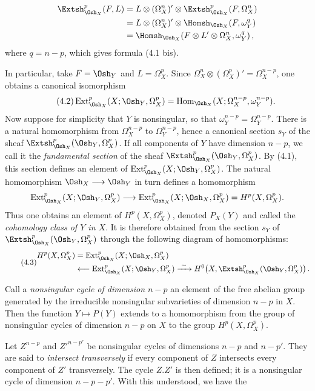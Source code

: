 \begin{align*}
\Extsh_{\Osh_X}^{p}(F,L)
&=L\otimes(\Omega_X^{n})'\otimes
  \Extsh_{\Osh_X}^{p}(F,\Omega_X^{n})\\
&=L\otimes(\Omega_X^{n})'\otimes
  \Homsh_{\Osh_X}(F,\omega_Y^{q})\\
&=\Homsh_{\Osh_X}\!\left(
  F\otimes L'\otimes\Omega_X^{n},\omega_Y^{q}\right),
\end{align*}
where $q=n-p$, which gives formula (4.1 bis).

In particular, take $F=\Osh_Y$ and $L=\Omega_X^{p}$. Since
$\Omega_X^{n}\otimes(\Omega_X^{p})'=\Omega_X^{n-p}$, one obtains a canonical
isomorphism
\begin{equation}\tag{4.2}
  \operatorname{Ext}_{\Osh_X}^{p}(X;\Osh_Y,\Omega_X^{p})
  =\operatorname{Hom}_{\Osh_X}
  (X;\Omega_X^{n-p},\omega_Y^{n-p}).
\end{equation}
Now suppose for simplicity that $Y$ is nonsingular, so that
$\omega_Y^{n-p}=\Omega_Y^{n-p}$. There is a natural homomorphism from
$\Omega_X^{n-p}$ to $\Omega_Y^{n-p}$, hence a canonical section $s_Y$ of the
sheaf $\Extsh_{\Osh_X}^{p}(\Osh_Y,\Omega_X^{p})$. If all components of $Y$ have
dimension $n-p$, we call it the \emph{fundamental section} of the sheaf
$\Extsh_{\Osh_X}^{p}(\Osh_Y,\Omega_X^{p})$. By (4.1), this section defines an
element of $\operatorname{Ext}_{\Osh_X}^{p}(X;\Osh_Y,\Omega_X^{p})$. The natural
homomorphism $\Osh_X\longrightarrow\Osh_Y$ in turn defines a homomorphism
\[
  \operatorname{Ext}_{\Osh_X}^{p}(X;\Osh_Y,\Omega_X^{p})
  \longrightarrow
  \operatorname{Ext}_{\Osh_X}^{p}(X;\Osh_X,\Omega_X^{p})
  =H^{p}(X,\Omega_X^{p}).
\]
Thus one obtains an element of $H^{p}(X,\Omega_X^{p})$, denoted $P_X(Y)$ and
called the \emph{cohomology class of $Y$ in $X$}. It is therefore obtained from
the section $s_Y$ of $\Extsh_{\Osh_X}^{p}(\Osh_Y,\Omega_X^{p})$ through the
following diagram of homomorphisms:
\begin{equation}\tag{4.3}
\begin{aligned}
H^{p}(X,\Omega_X^{p})
&=\operatorname{Ext}_{\Osh_X}^{p}(X;\Osh_X,\Omega_X^{p})\\
&\longleftarrow\operatorname{Ext}_{\Osh_X}^{p}(X;\Osh_Y,\Omega_X^{p})
\xrightarrow{\ \sim\ }
H^{0}\!\left(X,\Extsh_{\Osh_X}^{p}(\Osh_Y,\Omega_X^{p})\right).
\end{aligned}
\end{equation}

Call a \emph{nonsingular cycle of dimension $n-p$} an element of the free
abelian group generated by the irreducible nonsingular subvarieties of dimension
$n-p$ in $X$. Then the function $Y\longmapsto P(Y)$ extends to a homomorphism
from the group of nonsingular cycles of dimension $n-p$ on $X$ to the group
$H^{p}(X,\Omega_X^{p})$.

Let $Z^{n-p}$ and $Z'^{n-p'}$ be nonsingular cycles of dimensions $n-p$ and
$n-p'$. They are said to \emph{intersect transversely} if every component of
$Z$ intersects every component of $Z'$ transversely. The cycle $Z.Z'$ is then
defined; it is a nonsingular cycle of dimension $n-p-p'$. With this understood,
we have the

